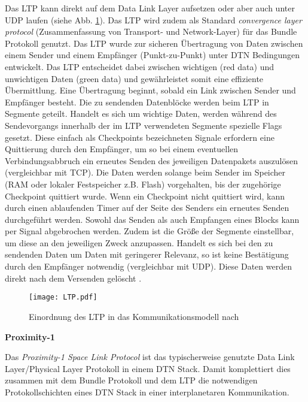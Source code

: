 Das \gls{LTP} kann direkt auf dem Data Link Layer
aufsetzen oder aber auch unter \gls{UDP} laufen (siehe Abb. \ref{fig:LTP}). Das \gls{LTP}
wird zudem als Standard \textit{convergence layer protocol} (Zusammenfassung von
Transport- und Network-Layer) f{\"u}r das Bundle Protokoll genutzt. Das \gls{LTP}
wurde zur sicheren {\"U}bertragung von Daten zwischen einem Sender und einem
Empf{\"a}nger (Punkt-zu-Punkt) unter \gls{DTN} Bedingungen entwickelt. Das \gls{LTP}
entscheidet dabei zwischen wichtigen (red data) und unwichtigen Daten (green
data) und gew{\"a}hrleistet somit eine effiziente {\"U}bermittlung. Eine
{\"U}bertragung beginnt, sobald ein Link zwischen Sender und Empf{\"a}nger
besteht. Die zu sendenden Datenbl{\"o}cke werden beim \gls{LTP} in Segmente geteilt.
Handelt es sich um wichtige Daten, werden w{\"a}hrend des Sendevorgangs
innerhalb der im \gls{LTP} verwendeten Segmente spezielle Flags gesetzt.
Diese einfach als Checkpoints bezeichneten Signale erfordern eine Quittierung
durch den Empf{\"a}nger, um so bei einem eventuellen Verbindungsabbruch ein
erneutes Senden des jeweiligen Datenpakets auszul{\"o}sen (vergleichbar mit
TCP). Die Daten werden solange beim Sender im Speicher (RAM oder lokaler
Festspeicher z.B. Flash) vorgehalten, bis der zugeh{\"o}rige Checkpoint
quittiert wurde. Wenn ein Checkpoint nicht quittiert wird, kann durch einen
ablaufenden Timer auf der Seite des Senders ein erneutes Senden durchgeführt
werden. Sowohl das Senden als auch Empfangen eines Blocks kann per Signal
abgebrochen werden. Zudem ist die Gr{\"o}{\ss}e der Segmente einstellbar, um
diese an den jeweiligen Zweck anzupassen. Handelt es sich bei den zu sendenden
Daten um Daten mit geringerer Relevanz, so ist keine Best{\"a}tigung durch den
Empf{\"a}nger notwendig (vergleichbar mit UDP).
Diese Daten werden direkt nach dem Versenden gel{\"o}scht \cite{web4}.

\begin{figure}[H]
\centering
\texttt{[image: LTP.pdf]}
\caption{Einordnung des LTP in das Kommunikationsmodell nach \cite{Burleigh}}
\label{fig:LTP}
\end{figure}

\textbf{Proximity-1}

Das \textit{Proximity-1 Space Link Protocol} ist das typischerweise genutzte
Data Link Layer/Physical Layer Protokoll in einem \gls{DTN} Stack. Damit komplettiert
dies zusammen mit dem Bundle Protokoll und dem \gls{LTP} die notwendigen
Protokollschichten eines \gls{DTN} Stack in einer interplanetaren Kommunikation.

